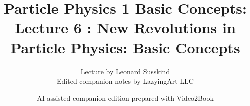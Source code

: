 \documentclass[11pt,oneside]{book}
\begin{document}
\frontmatter
\title{Particle Physics 1 Basic Concepts: Lecture 6 : New Revolutions in Particle Physics: Basic Concepts}
\author{Lecture by Leonard Susskind\\Edited companion notes by LazyingArt LLC}
\date{AI-assisted companion edition prepared with Video2Book}
\maketitle
\clearpage
\mainmatter

\end{document}
